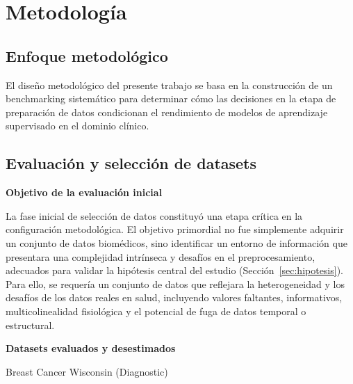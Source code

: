 \section{Metodología}\label{sec:metodologia}

\subsection{Enfoque metodológico}

El diseño metodológico del presente trabajo se basa en la construcción de un benchmarking sistemático para determinar cómo las decisiones en la etapa de preparación de datos condicionan el rendimiento de modelos de aprendizaje supervisado en el dominio clínico.

\subsection{Evaluación y selección de datasets}

\textbf{Objetivo de la evaluación inicial}

La fase inicial de selección de datos constituyó una etapa crítica en la
configuración metodológica. El objetivo primordial no fue simplemente adquirir un conjunto de datos biomédicos, sino identificar un entorno de información que presentara una complejidad intrínseca y desafíos en el preprocesamiento, adecuados para validar la hipótesis central
del estudio (Sección~\ref{sec:hipotesis}). Para ello, se requería un conjunto de datos que reflejara la heterogeneidad y los desafíos de los datos reales en salud, incluyendo valores faltantes, informativos, multicolinealidad fisiológica y el potencial de fuga de datos
temporal o estructural.

\textbf{Datasets evaluados y desestimados}

Breast Cancer Wisconsin (Diagnostic)~\citep{wolberg1993}


